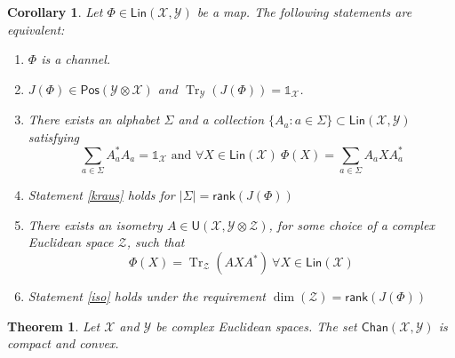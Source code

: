 \documentclass[aps,pra,onecolumn,notitlepage,superscriptaddress]{revtex4-1}
\newcommand{\spc}[1]{\mathcal{#1}}
\newcommand{\Lin}{\mathsf{Lin}}
\newcommand{\Pos}{\mathsf{Pos}}
\newcommand{\U}{\mathsf{U}}
\newcommand{\rank}{\mathsf{rank}}
\newcommand{\Tr}{\operatorname{Tr}}
\newcommand{\Chan}{{\mathsf{Chan}}}
\newcommand\I{\mathds{1}}
\newtheorem{theo}{Theorem}
\newtheorem{cor}{Corollary}
\begin{document}
    \begin{cor}
        Let $\Phi \in \Lin(\spc X, \spc Y)$ be a map. The following statements are equivalent:
        \begin{enumerate}
            \item $\Phi$ is a channel.
            \item $J(\Phi) \in \Pos(\spc Y \otimes \spc X)$ and $\Tr_{\spc Y} (J(\Phi)) = \I_{\spc X}$.
            \item \label{kraus} There exists an alphabet $\Sigma$ and a collection $\{A_a : a \in \Sigma\} \subset \Lin(\spc X, \spc Y)$
            satisfying
            \begin{equation}
                \sum_{a \in \Sigma} A_a^*A_a = \I_{\spc X} \text{ and } \forall X \in \Lin(\spc X) \ \Phi(X) = \sum_{a \in \Sigma} A_a X A_a^*
            \end{equation}
            \item Statement \ref{kraus} holds for $|\Sigma| = \rank(J(\Phi))$
            \item \label{iso} There exists an isometry $A \in \U(\spc X, \spc Y \otimes \spc Z)$, for some choice of a complex Euclidean space $\spc Z$, such that
            \begin{equation}
                \Phi(X) = \Tr_{\spc Z}(AXA^*) \ \forall X \in \Lin(\spc X)
            \end{equation}
            \item Statement \ref{iso} holds under the requirement $\dim (\spc Z) = \rank (J(\Phi))$
        \end{enumerate}
    \end{cor}

    \begin{theo}
        Let $\spc X$ and $\spc Y$ be complex Euclidean spaces. The set $\Chan(\spc X, \spc Y)$ is compact and convex.
    \end{theo}
\end{document}
